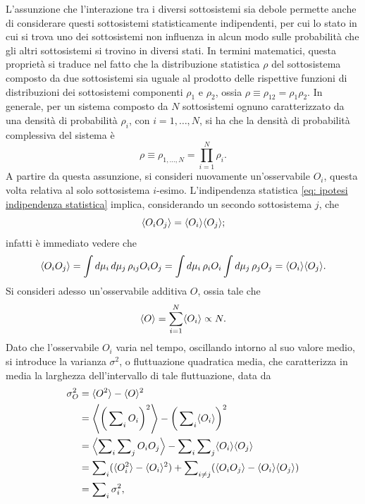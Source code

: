 L'assunzione che l'interazione tra i diversi sottosistemi sia debole permette anche di considerare questi sottosistemi statisticamente indipendenti, per cui lo stato in cui si trova uno dei sottosistemi non influenza in alcun modo sulle probabilità che gli altri sottosistemi si trovino in diversi stati. In termini matematici, questa proprietà si traduce nel fatto che la distribuzione statistica $\rho$ del sottosistema composto da due sottosistemi sia uguale al prodotto delle rispettive funzioni di distribuzioni dei sottosistemi componenti $\rho_1$ e $\rho_2$, ossia $\rho \equiv \rho_{12} = \rho_1\rho_2$. In generale, per un sistema composto da $N$ sottosistemi ognuno caratterizzato da una densità di probabilità $\rho_i$, con $i=1,\dots,N$, si ha che la densità di probabilità complessiva del sistema è
\begin{equation}
\label{eq: ipotesi indipendenza statistica}
    \rho \equiv \rho_{1,\dots,N} = \prod_{i = 1}^N\rho_i.
\end{equation}
A partire da questa assunzione, si consideri nuovamente un'osservabile $O_i$, questa volta relativa al solo sottosistema $i$-esimo. L'indipendenza statistica \eqref{eq: ipotesi indipendenza statistica} implica, considerando un secondo sottosistema $j$, che
\begin{equation}
    \langle O_iO_j \rangle = \langle O_i \rangle\langle O_j \rangle;
\end{equation}
infatti è immediato vedere che
\begin{equation}
    \langle O_iO_j \rangle = \int d\mu_i\,d\mu_j\,\rho_{ij}O_iO_j = \int d\mu_i\,\rho_iO_i\int d\mu_j\,\rho_jO_j = \langle O_i \rangle\langle O_j \rangle.
\end{equation}
Si consideri adesso un'osservabile additiva $O$, ossia tale che
\begin{equation}
    \langle O \rangle = \sum_{i = 1}^N\langle O_i \rangle \propto N.
\end{equation}
Dato che l'osservabile $O_i$ varia nel tempo, oscillando intorno al suo valore medio, si introduce la varianza $\sigma^2$, o fluttuazione quadratica media, che caratterizza in media la larghezza dell'intervallo di tale fluttuazione, data da
\begin{equation}
\label{eq: varianza O}
    \begin{split}
        \sigma^2_O &= \langle O^2 \rangle - \langle O \rangle^2 \\
        &= \left\langle \bigg(\sum\nolimits_iO_i\bigg)^2 \right\rangle - \bigg(\sum\nolimits_i\langle O_i \rangle\bigg)^2 \\
        &= \left\langle \sum\nolimits_i\sum\nolimits_jO_iO_j \right\rangle - \sum\nolimits_i\sum\nolimits_j\langle O_i \rangle\langle O_j \rangle \\
        &= \sum\nolimits_i(\langle O_i^2 \rangle - \langle O_i \rangle^2) + \sum\nolimits_{i\neq j}(\langle O_iO_j \rangle - \langle O_i \rangle\langle O_j \rangle) \\
        &= \sum\nolimits_i\sigma^2_i,
    \end{split}
\end{equation}

